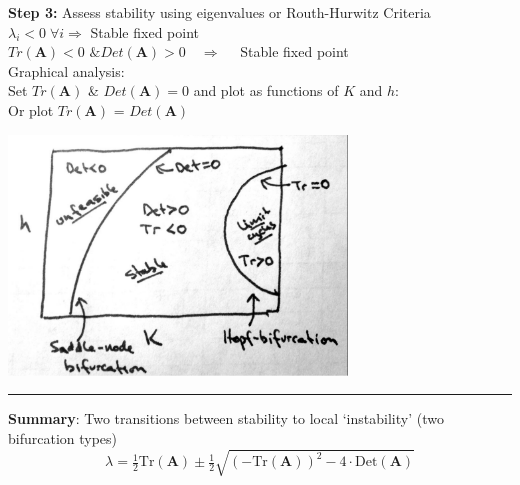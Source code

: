 \documentclass{article}
\newcommand{\ind}{\-\hspace{1cm}}
\begin{document}
\textbf{Step 3:} Assess stability using eigenvalues or Routh-Hurwitz Criteria\\
\ind $\lambda_i <0 \; \forall i \Rightarrow $ Stable fixed point\\
\ind $Tr(\mathbf{A}) < 0 \text{ \& } Det(\mathbf{A})>0 \quad \Rightarrow \quad $ Stable fixed point\\

Graphical analysis:\\
\ind Set $Tr(\mathbf{A})$ \& $Det(\mathbf{A})=0$ and plot as functions of $K$ and $h$:\\
\ind Or plot $Tr(\mathbf{A})$ = $Det(\mathbf{A})$
\begin{center}
 	\includegraphics[width=9cm]{figs/h_v_K.pdf}\\
\end{center}

\rule[0.5ex]{\linewidth}{1pt}
\pagebreak

\textbf{Summary}: Two transitions between stability to local `instability' (two bifurcation types)
\begin{equation*}
	\lambda = \tfrac{1}{2}\text{Tr}(\textbf{A}) \pm \tfrac{1}{2}\sqrt{(-\text{Tr}(\textbf{A}))^2 - 4\cdot\text{Det}(\textbf{A})} 
\end{equation*}
\end{document}
